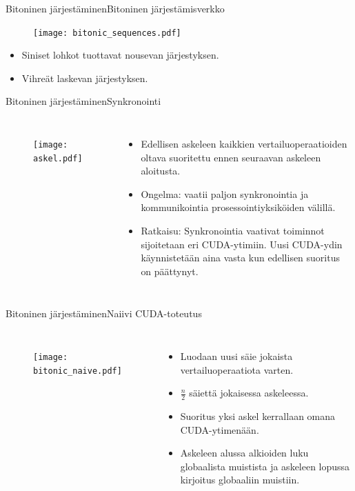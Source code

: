 \documentclass{beamer}
\begin{document}
\begin{frame}{Bitoninen järjestäminen}{Bitoninen järjestämisverkko}
    \begin{figure}
        \texttt{[image: bitonic\_sequences.pdf]}
    \end{figure}
    \begin{itemize}
      \item
        Siniset lohkot tuottavat nousevan järjestyksen.
      \item
        Vihreät laskevan järjestyksen.
    \end{itemize}
\end{frame}

\begin{frame}{Bitoninen järjestäminen}{Synkronointi}
\begin{columns}
    \begin{figure}
        \texttt{[image: askel.pdf]}
    \end{figure}
    \begin{itemize}
        \item
          Edellisen askeleen kaikkien vertailuoperaatioiden oltava suoritettu ennen seuraavan askeleen aloitusta.
        \item
          Ongelma: vaatii paljon synkronointia ja kommunikointia prosessointiyksiköiden välillä.
        \item
          Ratkaisu: Synkronointia vaativat toiminnot sijoitetaan eri CUDA-ytimiin. Uusi CUDA-ydin käynnistetään aina vasta kun edellisen suoritus on päättynyt.
    \end{itemize}
\end{columns}
\end{frame}

\begin{frame}{Bitoninen järjestäminen}{Naiivi CUDA-toteutus}
\begin{columns}
    \begin{figure}
        \texttt{[image: bitonic\_naive.pdf]}
    \end{figure}
    \begin{itemize}
        \item Luodaan uusi säie jokaista vertailuoperaatiota varten.
        \item $\frac{n}{2}$ säiettä jokaisessa askeleessa.
        \item Suoritus yksi askel kerrallaan omana CUDA-ytimenään.
        \item Askeleen alussa alkioiden luku globaalista muistista ja askeleen lopussa kirjoitus globaaliin muistiin.
    \end{itemize}
\end{columns}
\end{frame}
\end{document}
